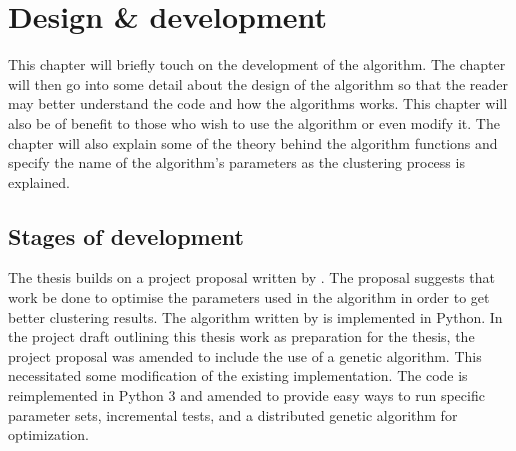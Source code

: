 
\chapter{Design \& development} %

\label{DesignDevelopment} %


This chapter will briefly touch on the development of the algorithm. The chapter will then go into some detail about the design of the algorithm so that the reader may better understand the code and how the algorithms works. This chapter will also be of benefit to those who wish to use the algorithm or even modify it. The chapter will also explain some of the theory behind the algorithm functions and specify the name of the algorithm's parameters as the clustering process is explained.

\section{Stages of development}
The thesis builds on a project proposal written by \supervisor. The proposal suggests that work be done to optimise the parameters used in the \STC algorithm in order to get better clustering results. The \CTC algorithm written by \supervisor is implemented in Python. In the project draft outlining this thesis work as preparation for the thesis, the project proposal was amended to include the use of a genetic algorithm. This necessitated some modification of the existing implementation. The code is reimplemented in Python 3 and amended to provide easy ways to run specific parameter sets, incremental tests, and a distributed genetic algorithm for optimization.

